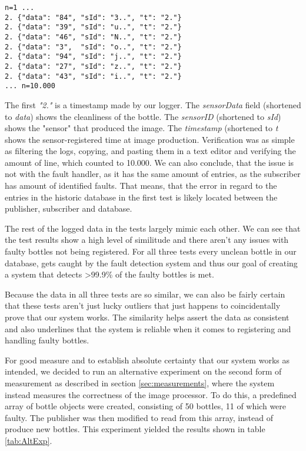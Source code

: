 \begin{lstlisting}[label=lst:log, caption=Logging format for verification]
n=1 ...
2. {"data": "84", "sId": "3..", "t": "2."}
2. {"data": "39", "sId": "u..", "t": "2."}
2. {"data": "46", "sId": "N..", "t": "2."}
2. {"data": "3",  "sId": "o..", "t": "2."}
2. {"data": "94", "sId": "j..", "t": "2."}
2. {"data": "27", "sId": "z..", "t": "2."}
2. {"data": "43", "sId": "i..", "t": "2."}
... n=10.000
\end{lstlisting}

The first \textit{"2."} is a timestamp made by our logger. The \textit{sensorData} field (shortened to \textit{data}) shows the cleanliness of the bottle. The \textit{sensorID} (shortened to \textit{sId}) shows the "sensor" that produced the image. The \textit{timestamp} (shortened to \textit{t} shows the sensor-registered time at image production. Verification was as simple as filtering the logs, copying, and pasting them in a text editor and verifying the amount of line, which counted to 10.000.
We can also conclude, that the issue is not with the fault handler, as it has the same amount of entries, as the subscriber has amount of identified faults. That means, that the error in regard to the entries in the historic database in the first test is likely located between the publisher, subscriber and database.



The rest of the logged data in the tests largely mimic each other. We can see that the test results show a high level of similitude and there aren't any issues with faulty bottles not being registered. For all three tests every unclean bottle in our database, gets caught by the fault detection system and thus our goal of creating a system that detects \textgreater99.9\% of the faulty bottles is met.

Because the data in all three tests are so similar, we can also be fairly certain that these tests aren't just lucky outliers that just happens to coincidentally prove that our system works. The similarity helps assert the data as consistent and also underlines that the system is reliable when it comes to registering and handling faulty bottles.

For good measure and to establish absolute certainty that our system works as intended, we decided to run an alternative experiment on the second form of measurement as described in section \ref{sec:measurements}, where the system instead measures the correctness of the image processor. To do this, a predefined array of bottle objects were created, consisting of 50 bottles, 11 of which were faulty. The publisher was then modified to read from this array, instead of produce new bottles. This experiment yielded the results shown in table \ref{tab:AltExp}.

